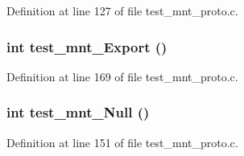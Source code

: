 Definition at line 127 of file test\_\-mnt\_\-proto.c.
\subsubsection[{test\_\-mnt\_\-Export}]{\setlength{\rightskip}{0pt plus 5cm}int test\_\-mnt\_\-Export ()}\label{test__mnt__proto_8c_cc06b966584ff390efa22aa422aa21a0}




Definition at line 169 of file test\_\-mnt\_\-proto.c.
\subsubsection[{test\_\-mnt\_\-Null}]{\setlength{\rightskip}{0pt plus 5cm}int test\_\-mnt\_\-Null ()}\label{test__mnt__proto_8c_3a63791505a7b76d63380f9daa870c15}




Definition at line 151 of file test\_\-mnt\_\-proto.c.